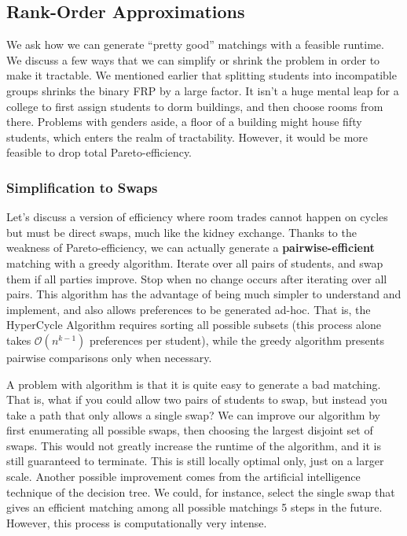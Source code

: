 \documentclass[12pt]{article}
\begin{document}
\subsection*{Rank-Order Approximations}
We ask how we can generate ``pretty good'' matchings with a feasible runtime. We discuss a few ways that we can simplify or shrink the problem in order to make it tractable. We mentioned earlier that splitting students into incompatible groups shrinks the binary FRP by a large factor. It isn't a huge mental leap for a college to first assign students to dorm buildings, and then choose rooms from there. Problems with genders aside, a floor of a building might house fifty students, which enters the realm of tractability. However, it would be more feasible to drop total Pareto-efficiency. 

\subsubsection*{Simplification to Swaps}
Let's discuss a version of efficiency where room trades cannot happen on cycles but must be direct swaps, much like the kidney exchange. Thanks to the weakness of Pareto-efficiency, we can actually generate a \textbf{pairwise-efficient} matching with a greedy algorithm. Iterate over all pairs of students, and swap them if all parties improve. Stop when no change occurs after iterating over all pairs. This algorithm has the advantage of being much simpler to understand and implement, and also allows preferences to be generated ad-hoc. That is, the HyperCycle Algorithm requires sorting all possible subsets (this process alone takes $\mathcal{O}(n^{k - 1})$ preferences per student), while the greedy algorithm presents pairwise comparisons only when necessary. 

A problem with algorithm is that it is quite easy to generate a bad matching. That is, what if you could allow two pairs of students to swap, but instead you take a path that only allows a single swap? We can improve our algorithm by first enumerating all possible swaps, then choosing the largest disjoint set of swaps. This would not greatly increase the runtime of the algorithm, and it is still guaranteed to terminate. This is still locally optimal only, just on a larger scale. Another possible improvement comes from the artificial intelligence technique of the decision tree. We could, for instance, select the single swap that gives an efficient matching among all possible matchings 5 steps in the future. However, this process is computationally very intense.
\end{document}

